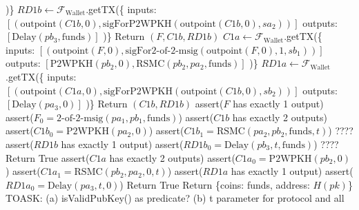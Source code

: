 \begin{algorithmic}[1]
      \State )\}
      \State $RD1b \gets \mathcal{F}_{\mathrm{Wallet}}$.getTX(\{
      \State inputs: $\left[\left(\mathrm{outpoint}\left(C1b, 0\right),
      \text{sigForP2WPKH}\left(\mathrm{outpoint}\left(C1b, 0\right),
      sa_2\right)\right)\right]$
      \State outputs: $\left[\mathrm{Delay}\left(pb_3, \mathrm{funds}\right)\right]$
      \State )\}
      \State Return $\left(F, C1b, RD1b\right)$
    \EndProcedure
    \State
      \State $C1a \gets \mathcal{F}_{\mathrm{Wallet}}$.getTX(\{
      \State inputs: $\left[\left(\mathrm{outpoint}\left(F, 0\right),
      \text{sigFor2-of-2-msig}\left(\mathrm{outpoint}\left(F, 0\right), 1,
      sb_1\right)\right)\right]$
      \State outputs: $\left[\mathrm{P2WPKH}\left(pb_2, 0\right), \mathrm{RSMC}\left(pb_2,
      pa_2, \mathrm{funds}\right)\right]$
      \State )\}
      \State $RD1a \gets \mathcal{F}_{\mathrm{Wallet}}$.getTX(\{
      \State inputs: $\left[\left(\mathrm{outpoint}\left(C1a, 0\right),
      \text{sigForP2WPKH}\left(\mathrm{outpoint}\left(C1b, 0\right),
      sb_2\right)\right)\right]$
      \State outputs: $\left[\mathrm{Delay}\left(pa_3, 0\right)\right]$
      \State )\}
      \State Return $\left(C1b, RD1b\right)$
    \EndProcedure
    \State
      \State assert($F$ has exactly 1 output)
      \State assert($F_0 = \text{2-of-2-msig}\left(pa_1, pb_1, \mathrm{funds}\right)$)
      \State assert($C1b$ has exactly 2 outputs)
      \State assert($C1b_0 = \mathrm{P2WPKH}\left(pa_2, 0\right)$)
      \State assert($C1b_1 = \mathrm{RSMC}\left(pa_2, pb_2, \mathrm{funds}, t\right)$)
      ????
      \State assert($RD1b$ has exactly 1 output)
      \State assert($RD1b_0 = \mathrm{Delay}\left(pb_3, t, \mathrm{funds}\right)$) ????
      \State Return True
    \EndProcedure
    \State
      \State assert($C1a$ has exactly 2 outputs)
      \State assert($C1a_0 = \mathrm{P2WPKH}\left(pb_2, 0\right)$)
      \State assert($C1a_1 = \mathrm{RSMC}\left(pb_2, pa_2, 0, t\right)$)
      \State assert($RD1a$ has exactly 1 output)
      \State assert($RD1a_0 = \mathrm{Delay}\left(pa_3, t, 0\right)$)
      \State Return True
    \EndProcedure
    \State
      \State Return \{coins: funds, address: $H\left(pk\right)$\}
    \EndProcedure
    \State
    \State TOASK: (a) isValidPubKey() as predicate? (b) t parameter for protocol and all

\end{algorithmic}
